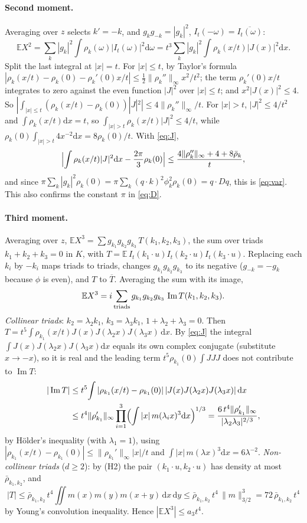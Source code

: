 \documentclass[11pt]{article}
\newcommand{\dd}{\mathrm{d}}
\newcommand{\E}{\mathbb{E}}
\renewcommand{\Im}{\operatorname{Im}}
\newcommand{\bbar}{\bar\rho}
\newcommand{\nrm}[1]{\|#1\|_\infty}
\theoremstyle{remark}
\begin{document}
\paragraph{Second moment.} Averaging over $z$ selects $k'=-k$, and
$g_kg_{-k}=|g_k|^2$, $I_t(-\omega)=\overline{I_t(\omega)}$:
\[
  \E X^2=\sum_k|g_k|^2\int\rho_k(\omega)|I_t(\omega)|^2\dd\omega
  =t^3\sum_k|g_k|^2\int\rho_k(x/t)|J(x)|^2\dd x .
\]
Split the last integral at $|x|=t$. For $|x|\le t$, by Taylor's formula
$|\rho_k(x/t)-\rho_k(0)-\rho_k'(0)x/t|\le\frac12\nrm{\rho_k''}x^2/t^2$; the
term $\rho_k'(0)x/t$ integrates to zero against the even function $|J|^2$
over $|x|\le t$; and $x^2|J(x)|^2\le4$. So
$|\int_{|x|\le t}(\rho_k(x/t)-\rho_k(0))|J|^2|\le4\nrm{\rho_k''}/t$. For
$|x|>t$, $|J|^2\le4/t^2$ and $\int\rho_k(x/t)\dd x=t$, so
$\int_{|x|>t}\rho_k(x/t)|J|^2\le4/t$, while
$\rho_k(0)\int_{|x|>t}4x^{-2}\dd x=8\rho_k(0)/t$. With \eqref{eq:J},
\[
  \Bigl|\int\rho_k(x/t)|J|^2\dd x-\frac{2\pi}{3}\rho_k(0)\Bigr|
  \le\frac{4\nrm{\rho_k''}+4+8\bbar_k}{t},
\]
and since $\pi\sum_k|g_k|^2\rho_k(0)=\pi\sum_k(q\cdot k)^2\phi_k^2\rho_k(0)
=q\cdot Dq$, this is \eqref{eq:var}. This also confirms the constant
$\pi$ in \eqref{eq:D}.

\paragraph{Third moment.} Averaging over $z$,
$\E X^3=\sum g_{k_1}g_{k_2}g_{k_3}\,T(k_1,k_2,k_3)$, the sum over triads
$k_1+k_2+k_3=0$ in $K$, with
$T=\E\,I_t(k_1\cdot u)I_t(k_2\cdot u)I_t(k_3\cdot u)$. Replacing each $k_i$
by $-k_i$ maps triads to triads, changes $g_{k_1}g_{k_2}g_{k_3}$ to its
negative ($g_{-k}=-g_k$ because $\phi$ is even), and $T$ to $\overline T$.
Averaging the sum with its image,
\begin{equation}
  \E X^3=i\sum_{\rm triads}g_{k_1}g_{k_2}g_{k_3}\,\Im T(k_1,k_2,k_3).
  \label{eq:third}
\end{equation}
\emph{Collinear triads}: $k_2=\lambda_2k_1$, $k_3=\lambda_3k_1$,
$1+\lambda_2+\lambda_3=0$. Then
$T=t^5\int\rho_{k_1}(x/t)J(x)J(\lambda_2x)J(\lambda_3x)\,\dd x$. By
\eqref{eq:J} the integral $\int J(x)J(\lambda_2x)J(\lambda_3x)\dd x$ equals
its own complex conjugate (substitute $x\to-x$), so it is real and the
leading term $t^5\rho_{k_1}(0)\int JJJ$ does not contribute to $\Im T$:
\begin{align*}
  |\Im T|&\le t^5\!\int|\rho_{k_1}(x/t)-\rho_{k_1}(0)|\,
  |J(x)J(\lambda_2x)J(\lambda_3x)|\,\dd x\\
  &\le t^4\nrm{\rho_{k_1}'}\prod_{i=1}^3\Bigl(\int|x|\,m(\lambda_ix)^3\dd x
  \Bigr)^{1/3}
  =\frac{6\,t^4\nrm{\rho_{k_1}'}}{|\lambda_2\lambda_3|^{2/3}},
\end{align*}
by H\"older's inequality (with $\lambda_1=1$), using
$|\rho_{k_1}(x/t)-\rho_{k_1}(0)|\le\nrm{\rho_{k_1}'}|x|/t$ and
$\int|x|\,m(\lambda x)^3\dd x=6\lambda^{-2}$.
\emph{Non-collinear triads} ($d\ge2$): by \textup{(H2)} the pair
$(k_1\cdot u,k_2\cdot u)$ has density at most $\bbar_{k_1,k_2}$, and
\[
  |T|\le\bbar_{k_1,k_2}\,t^4\!\iint m(x)m(y)m(x+y)\,\dd x\,\dd y
  \le\bbar_{k_1,k_2}\,t^4\,\|m\|_{3/2}^3=72\,\bbar_{k_1,k_2}\,t^4
\]
by Young's convolution inequality. Hence $|\E X^3|\le a_3t^4$.
\end{document}
